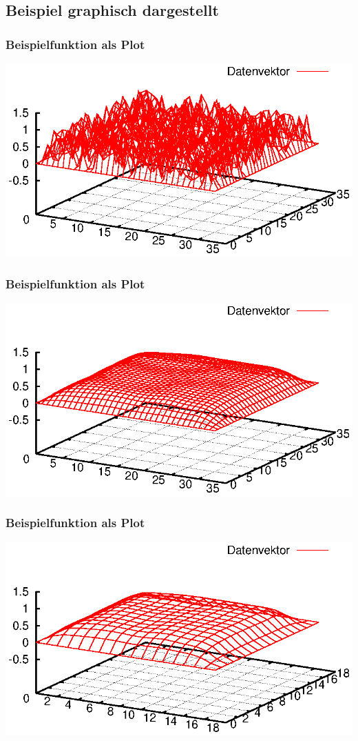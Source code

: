 \documentclass{beamer}
\begin{document}
\subsection{Beispiel graphisch dargestellt}
\begin{frame}\frametitle{Beispielfunktion als Plot}\includegraphics[trim=25 0 25 0, clip, width=\textwidth]{plots/000}\end{frame}
\begin{frame}\frametitle{Beispielfunktion als Plot}\includegraphics[trim=25 0 25 0, clip, width=\textwidth]{plots/001}\end{frame}
\begin{frame}\frametitle{Beispielfunktion als Plot}\includegraphics[trim=25 0 25 0, clip, width=\textwidth]{plots/002}\end{frame}
\end{document}
